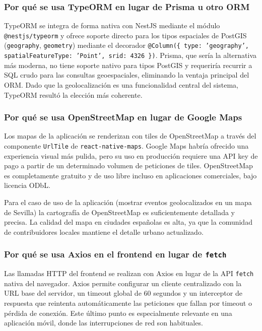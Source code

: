 \subsubsection{Por qué se usa TypeORM en lugar de Prisma u otro ORM}

TypeORM se integra de forma nativa con NestJS mediante el módulo \texttt{@nestjs/typeorm} y ofrece soporte directo para los tipos espaciales de PostGIS (\texttt{geography}, \texttt{geometry}) mediante el decorador \texttt{@Column(\{ type: 'geography', spatialFeatureType: 'Point', srid: 4326 \})}. Prisma, que sería la alternativa más moderna, no tiene soporte nativo para tipos PostGIS y requeriría recurrir a SQL crudo para las consultas geoespaciales, eliminando la ventaja principal del ORM. Dado que la geolocalización es una funcionalidad central del sistema, TypeORM resultó la elección más coherente.

\subsubsection{Por qué se usa OpenStreetMap en lugar de Google Maps}

Los mapas de la aplicación se renderizan con tiles de OpenStreetMap a través del componente \texttt{UrlTile} de \texttt{react-native-maps}. Google Maps habría ofrecido una experiencia visual más pulida, pero su uso en producción requiere una API key de pago a partir de un determinado volumen de peticiones de tiles. OpenStreetMap es completamente gratuito y de uso libre incluso en aplicaciones comerciales, bajo licencia ODbL.

Para el caso de uso de la aplicación (mostrar eventos geolocalizados en un mapa de Sevilla) la cartografía de OpenStreetMap es suficientemente detallada y precisa. La calidad del mapa en ciudades españolas es alta, ya que la comunidad de contribuidores locales mantiene el detalle urbano actualizado.

\subsubsection{Por qué se usa Axios en el frontend en lugar de \texttt{fetch}}

Las llamadas HTTP del frontend se realizan con Axios en lugar de la API \texttt{fetch} nativa del navegador. Axios permite configurar un cliente centralizado con la URL base del servidor, un timeout global de 60 segundos y un interceptor de respuesta que reintenta automáticamente las peticiones que fallan por timeout o pérdida de conexión. Este último punto es especialmente relevante en una aplicación móvil, donde las interrupciones de red son habituales.

